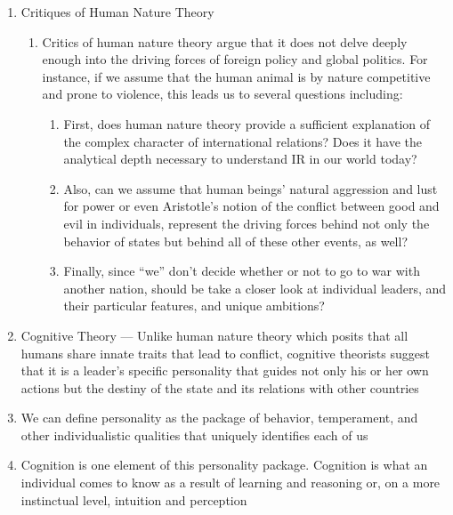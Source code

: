 \documentclass[12pt]{article}
\begin{document}
\begin{enumerate}
      \item Critiques of Human Nature Theory

        \begin{enumerate}

          \item Critics of human nature theory argue that it does not delve deeply enough into the driving forces of foreign policy and global politics. For instance, if we assume that the human animal is by nature competitive and prone to violence, this leads us to several questions including: 

            \begin{enumerate}

              \item First, does human nature theory provide a sufficient explanation of the complex character of international relations? Does it have the analytical depth necessary to understand IR in our world today?

              \item Also, can we assume that human beings’ natural aggression and lust for power or even Aristotle’s notion of the conflict between good and evil in individuals, represent the driving forces behind not only the behavior of states but behind all of these other events, as well?

              \item Finally, since “we” don’t decide whether or not to go to war with another nation, should be take a closer look at individual leaders, and their particular features, and unique ambitions? 

            \end{enumerate}

        \end{enumerate}

      \item Cognitive Theory — Unlike human nature theory which posits that all humans share innate traits that lead to conflict, cognitive theorists suggest that it is a leader’s specific personality that guides not only his or her own actions but the destiny of the state and its relations with other countries 

      \item We can define personality as the package of behavior, temperament, and other individualistic qualities that uniquely identifies each of us

      \item Cognition is one element of this personality package.  Cognition is what an individual comes to know as a result of learning and reasoning or, on a more instinctual level, intuition and perception


\end{enumerate}
\end{document}
